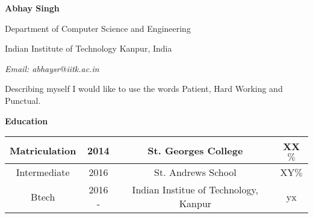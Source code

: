 \documentclass[12pt]{article}
\begin{document}
\begin{flushleft}

\textbf{\LARGE Abhay Singh}

Department of Computer Science and Engineering

Indian Institute of Technology Kanpur, India

\emph{Email: abhaysr$@$iitk.ac.in}

\bigskip

\noindent\hrulefill

\vspace{-4mm}

\noindent\hrulefill

Describing myself I would like to use the words Patient, Hard Working and Punctual.

\noindent\hrulefill

\vspace{-4mm}

\noindent\hrulefill 

\bigskip

\textbf{\Large Education}

\bigskip

\begin{tabular}{ |c|c|c|c| }

\hline

Matriculation{\hspace{1mm}} & {\hspace{1mm}}2014{\hspace{1mm}} & {\hspace{1mm}}St. Georges College {\hspace{1mm}}&{\hspace{1mm}} XX$\%$ \\ \hline

Intermediate {\hspace{1mm}}& {\hspace{1mm}} 2016 {\hspace{1mm}}& {\hspace{1mm}} St. Andrews School {\hspace{1mm}} &{\hspace{1mm}} XY$\%$ \\ \hline

Btech & {\hspace{1mm}} 2016 - {\hspace{1mm}} & {\hspace{1mm}}Indian Institue of Technology, Kanpur{\hspace{1mm}}& {\hspace{1mm}}yx\\


\end{tabular}
\end{flushleft}
\end{document}
